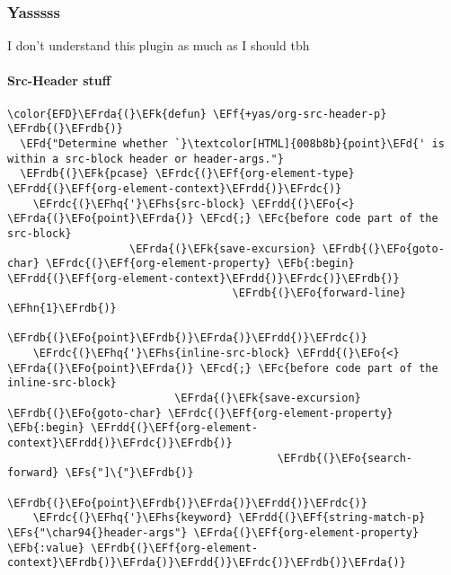 \documentclass{article}
\newcommand{\EFc}[1]{\textcolor{EFc}{#1}} %
\newcommand{\EFcd}[1]{\textcolor{EFcd}{#1}} %
\newcommand{\EFs}[1]{\textcolor{EFs}{#1}} %
\newcommand{\EFd}[1]{\textcolor{EFd}{#1}} %
\newcommand{\EFk}[1]{\textcolor{EFk}{#1}} %
\newcommand{\EFb}[1]{\textcolor{EFb}{#1}} %
\newcommand{\EFf}[1]{\textcolor{EFf}{#1}} %
\newcommand{\EFo}[1]{\textcolor{EFo}{#1}} %
\newcommand{\EFhn}[1]{\textcolor{EFhn}{\textbf{#1}}} %
\newcommand{\EFhq}[1]{#1} %
\newcommand{\EFhs}[1]{\textcolor{EFhs}{#1}} %
\newcommand{\EFrda}[1]{\textcolor{EFrda}{#1}} %
\newcommand{\EFrdb}[1]{\textcolor{EFrdb}{#1}} %
\newcommand{\EFrdc}[1]{\textcolor{EFrdc}{#1}} %
\newcommand{\EFrdd}[1]{\textcolor{EFrdd}{#1}} %
\begin{document}
\subsubsection{Yasssss}
\label{sec:org3604a25}
I don't understand this plugin as much as I should tbh
\paragraph{Src-Header stuff}
\label{sec:orge3ce91f}
\begin{Code}
\begin{Verbatim}
\color{EFD}\EFrda{(}\EFk{defun} \EFf{+yas/org-src-header-p} \EFrdb{(}\EFrdb{)}
  \EFd{"Determine whether `}\textcolor[HTML]{008b8b}{point}\EFd{' is within a src-block header or header-args."}
  \EFrdb{(}\EFk{pcase} \EFrdc{(}\EFf{org-element-type} \EFrdd{(}\EFf{org-element-context}\EFrdd{)}\EFrdc{)}
    \EFrdc{(}\EFhq{'}\EFhs{src-block} \EFrdd{(}\EFo{<} \EFrda{(}\EFo{point}\EFrda{)} \EFcd{;} \EFc{before code part of the src-block}
                   \EFrda{(}\EFk{save-excursion} \EFrdb{(}\EFo{goto-char} \EFrdc{(}\EFf{org-element-property} \EFb{:begin} \EFrdd{(}\EFf{org-element-context}\EFrdd{)}\EFrdc{)}\EFrdb{)}
                                   \EFrdb{(}\EFo{forward-line} \EFhn{1}\EFrdb{)}
                                   \EFrdb{(}\EFo{point}\EFrdb{)}\EFrda{)}\EFrdd{)}\EFrdc{)}
    \EFrdc{(}\EFhq{'}\EFhs{inline-src-block} \EFrdd{(}\EFo{<} \EFrda{(}\EFo{point}\EFrda{)} \EFcd{;} \EFc{before code part of the inline-src-block}
                          \EFrda{(}\EFk{save-excursion} \EFrdb{(}\EFo{goto-char} \EFrdc{(}\EFf{org-element-property} \EFb{:begin} \EFrdd{(}\EFf{org-element-context}\EFrdd{)}\EFrdc{)}\EFrdb{)}
                                          \EFrdb{(}\EFo{search-forward} \EFs{"]\{"}\EFrdb{)}
                                          \EFrdb{(}\EFo{point}\EFrdb{)}\EFrda{)}\EFrdd{)}\EFrdc{)}
    \EFrdc{(}\EFhq{'}\EFhs{keyword} \EFrdd{(}\EFf{string-match-p} \EFs{"\char94{}header-args"} \EFrda{(}\EFf{org-element-property} \EFb{:value} \EFrdb{(}\EFf{org-element-context}\EFrdb{)}\EFrda{)}\EFrdd{)}\EFrdc{)}\EFrdb{)}\EFrda{)}

\end{Verbatim}
\end{Code}
\end{document}
